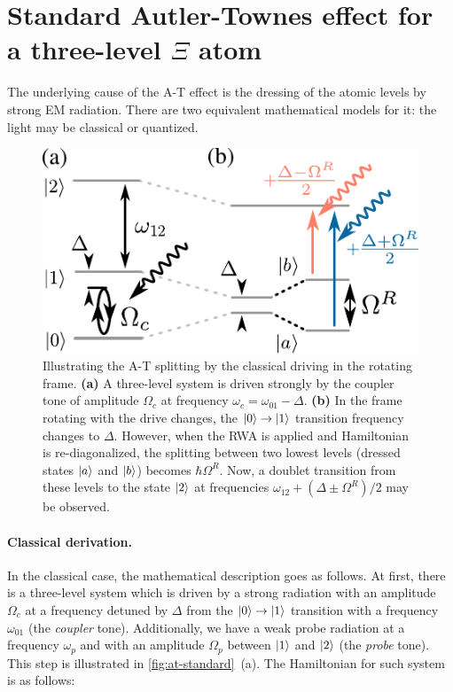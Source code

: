 \documentclass[%
 aps, prx,
 amsmath,amssymb,
 reprint,%
superscriptaddress
]{revtex4-2}
\begin{document}
\section{Standard Autler-Townes effect for a three-level $\Xi$ atom} \label{sec:3-level-at}

The underlying cause of the A-T effect is the dressing of the atomic levels by strong EM radiation. There are two equivalent mathematical models for it: the light may be classical or quantized.

\begin{figure}[b]	
	\includegraphics[width=\linewidth]{intro_scheme}
	\caption{Illustrating the A-T splitting by  the classical driving in the rotating frame. \textbf{(a)} A three-level system is driven strongly by the coupler tone of amplitude $\Omega_c$ at frequency $\omega_c = \omega_{01}-\Delta$. \textbf{(b)} In the frame rotating with the drive changes, the $\ket{0}\rightarrow \ket{1}$ transition frequency changes to $\Delta$. However, when the RWA is applied and Hamiltonian is re-diagonalized, the splitting between two lowest levels (dressed states $\ket{a}$ and $\ket{b}$) becomes $\hbar \Omega^R$. Now, a doublet transition from these levels to the state $\ket{2}$ at frequencies $\omega_{12}+(\Delta \pm \Omega^R)/2$ may be observed.} 
	\label{fig:at-standard}
\end{figure}

\paragraph{Classical derivation.} In the classical case, the mathematical description goes as follows. At first, there is a three-level system which is driven by a strong radiation with an amplitude $\Omega_c$ at a frequency detuned by $\Delta$ from the $\ket{0}\rightarrow \ket{1}$ transition with a frequency $\omega_{01}$ (the \textit{coupler} tone). Additionally, we have a weak probe radiation at a frequency $\omega_{p}$ and with an amplitude $\Omega_p$ between $\ket{1}$ and $\ket{2}$ (the \textit{probe} tone). This step is illustrated in \autoref{fig:at-standard}~(a). The Hamiltonian for such system is as follows:
\end{document}
